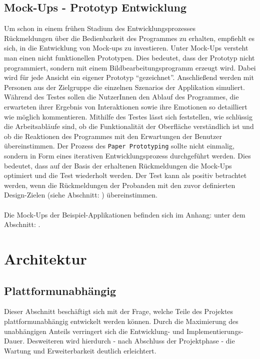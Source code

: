 \documentclass[Bachelorarbeit.tex]{subfiles}
\begin{document}
\subsection*{Mock-Ups - Prototyp Entwicklung}
\label{sub:mockUps}
Um schon in einem frühen Stadium des Entwicklungsprozesses\\ Rückmeldungen über die Bedienbarkeit des Programmes zu erhalten, empfiehlt es sich, in die Entwicklung von Mock-ups zu investieren.
Unter Mock-Ups versteht man einen nicht funktionellen Prototypen. 
Dies bedeutet, dass der Prototyp nicht programmiert, sondern mit einem Bildbearbeitungsprogramm erzeugt wird.
Dabei wird für jede Ansicht ein eigener Prototyp "`gezeichnet"'. 
Anschließend werden mit Personen aus der Zielgruppe die einzelnen Szenarios der Applikation simuliert. 
Während des Testes sollen die NutzerInnen den Ablauf des Programmes, die erwarteten ihrer Ergebnis von Interaktionen sowie ihre Emotionen so detailliert wie möglich kommentieren.  
Mithilfe des Testes lässt sich feststellen, wie schlüssig die Arbeitsabläufe sind, ob die Funktionalität der Oberfläche verständlich ist und ob die Reaktionen des Programmes mit den Erwartungen der Benutzer übereinstimmen. 
Der Prozess des \texttt{Paper Prototyping} sollte nicht einmalig, sondern in Form eines iterativen Entwicklungsprozess durchgeführt werden. 
Dies bedeutet, dass auf der Basis der erhaltenen Rückmeldungen die Mock-Ups optimiert und die Test wiederholt werden.
Der Test kann als positiv betrachtet werden, wenn die Rückmeldungen der Probanden mit den zuvor definierten Design-Zielen (siehe Abschnitt: ) übereinstimmen.\\
\\
Die Mock-Ups der Beispiel-Applikationen befinden sich im Anhang:   unter dem Abschnitt: . 

\newpage

\section{Architektur}
\label{sec:architektur}

\subsection*{Plattformunabhängig}
Dieser Abschnitt beschäftigt sich mit der Frage, welche Teile des Projektes plattformunabhängig entwickelt werden können. 
Durch die Maximierung des unabhängigen Anteils verringert sich die Entwicklung- und Implementierungs-Dauer.
Desweiteren wird hierdurch - nach Abschluss der Projektphase - die Wartung und Erweiterbarkeit  deutlich erleichtert.
\end{document}
